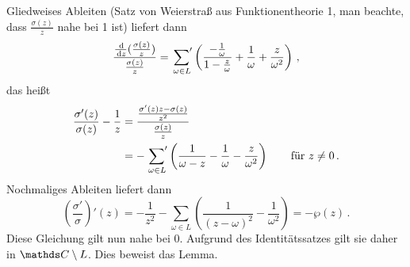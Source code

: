\begin{bewe}
\begin{bewe-list}
Gliedweises Ableiten (Satz von Weierstraß aus Funktionentheorie 1, man beachte, dass $\frac{\sigma(z)}{z}$ nahe bei 1 ist) liefert dann
\[
	\frac{\derive (\frac{\sigma(z)}{z})}{\frac{\sigma(z)}{z}}
	= \sumprime_{\omega \in L} \left(\frac{-\frac{1}{\omega}}{1-\frac{z}{\omega}} + \frac{1}{\omega} + \frac{z}{\omega^2}\right)
	\,,
\]
das heißt
\begin{align*}
	\frac{\sigma'(z)}{\sigma(z)} - \frac{1}{z}
	&= \frac{\frac{\sigma'(z)z-\sigma(z)}{z^2}}{\frac{\sigma(z)}{z}} \\
	&= - \sumprime_{\omega\in L} \left( \frac{1}{\omega-z} - \frac{1}{\omega} - \frac{z}{\omega^2} \right)
	\qquad \text{für } z \not= 0
	\,.
\end{align*}
Nochmaliges Ableiten liefert dann
\[
	\left(\frac{\sigma'}{\sigma}\right)'(z)
	= -\frac{1}{z^2} - \sum_{\omega\in L} \left(\frac{1}{(z-\omega)^2} - \frac{1}{\omega^2}\right)
	= -\wp(z)
	\,.
\]
Diese Gleichung gilt nun nahe bei 0.
Aufgrund des Identitätssatzes gilt sie daher in $\CC\setminus L$.
Dies beweist das Lemma.
\end{bewe-list}
\end{bewe}